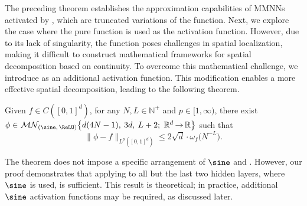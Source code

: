 \documentclass[11pt,a4paper]{article}
\begin{document}

The preceding theorem establishes the approximation capabilities of MMNNs activated by , which are truncated variations of the \sine{} function. Next, we explore the case where the pure \sine{} function is used as the activation function. However, due to its lack of singularity, the \sine{} function poses challenges in spatial localization, making it difficult to construct mathematical frameworks for spatial decomposition based on continuity.
To overcome this mathematical challenge, we introduce \ReLU{} as an additional activation function. This modification enables a more effective spatial decomposition, leading to the following theorem.

\begin{theorem}
\label{thm:main2}
Given $f \in C([0,1]^d)$, for any $N,L \in \mathbb{N}^+$ and $p \in [1,\infty)$, there exist  
$\phi\in \mn[\big]{(\sine,\,\ReLU)}{d(4N-1)}{3d}{L+2}{\mathbb{R}^d}{\mathbb{R}}$
such that
\[
\| \phi - f\|_{L^p([0,1]^d)} \leq  2\sqrt{d}\cdot\omega_f\big(N^{-L}\big).
\]
\end{theorem}
\begin{remark}
    The theorem does not impose a specific arrangement of $\sine$ and \ReLU{}. However, our proof demonstrates that applying \ReLU{} to all but the last two hidden layers, where $\sine$ is used, is sufficient. This result is theoretical; in practice, additional $\sine$ activation functions may be required, as discussed later.
\end{remark}

\end{document}
